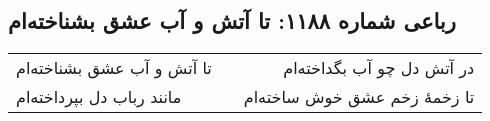 \begin{center}
\section*{رباعی شماره ۱۱۸۸: تا آتش و آب عشق بشناخته‌ام}
\label{sec:1188}
\begin{longtable}{l p{0.5cm} r}
تا آتش و آب عشق بشناخته‌ام
&&
در آتش دل چو آب بگداخته‌ام
\\
مانند رباب دل بپرداخته‌ام
&&
تا زخمهٔ زخم عشق خوش ساخته‌ام
\\
\end{longtable}
\end{center}
